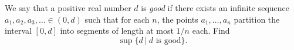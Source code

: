\documentclass{article}
\begin{document}
\setlength{\parindent}{0pt}
We say that a positive real number \(\displaystyle d\) is \emph{good} if there exists an infinite sequence \(\displaystyle a_1,a_2,a_3,\ldots \in (0,d)\) such that for each \(\displaystyle n\), the points \(\displaystyle a_1,\dots,a_n\) partition the interval \(\displaystyle [0,d]\) into segments of length at most \(\displaystyle 1/n\) each. Find$$\sup\Big\{d\ \big|\ d \text{ is good}\Big\}.$$
\end{document}
